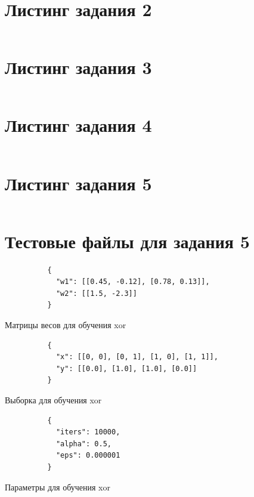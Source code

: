 \documentclass[bachelor, och, pract_otchet]{SCWorks}
\begin{document}
    \section{Листинг задания 2}
    \inputminted[fontsize=\footnotesize]{python3}{nntask2.py}

    \section{Листинг задания 3}
    \inputminted[fontsize=\footnotesize]{python3}{nntask3.py}

    \section{Листинг задания 4}
    \inputminted[fontsize=\footnotesize]{python3}{nntask4.py}

    \section{Листинг задания 5}
    \inputminted[fontsize=\footnotesize]{python3}{nntask5.py}

    \section{Тестовые файлы для задания 5}
      \begin{listing}[H]
        \begin{verbatim}
          {
            "w1": [[0.45, -0.12], [0.78, 0.13]],
            "w2": [[1.5, -2.3]]
          }
        \end{verbatim}
        \caption{Матрицы весов для обучения xor}
      \end{listing}

      \begin{listing}[H]
        \begin{verbatim}
          {
            "x": [[0, 0], [0, 1], [1, 0], [1, 1]],
            "y": [[0.0], [1.0], [1.0], [0.0]]
          }
        \end{verbatim}
        \caption{Выборка для обучения xor}
      \end{listing}

      \begin{listing}[H]
        \begin{verbatim}
          {
            "iters": 10000,
            "alpha": 0.5,
            "eps": 0.000001
          }
        \end{verbatim}
        \caption{Параметры для обучения xor}
      \end{listing}
\end{document}

